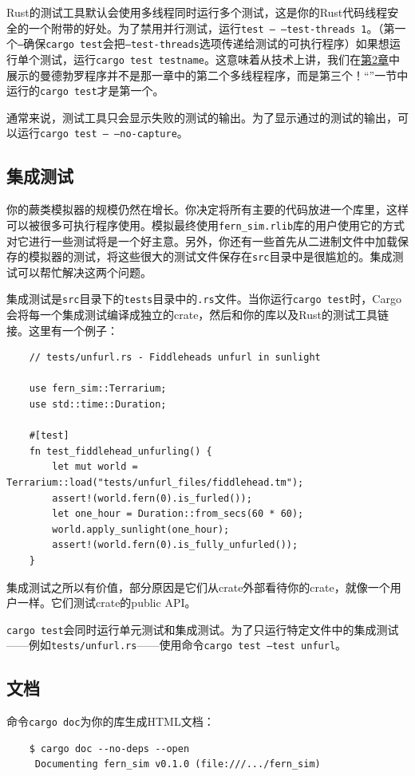 Rust的测试工具默认会使用多线程同时运行多个测试，这是你的Rust代码线程安全的一个附带的好处。为了禁用并行测试，运行\texttt{test -- --test-threads 1}。（第一个\texttt{--}确保\texttt{cargo test}会把\texttt{--test-threads}选项传递给测试的可执行程序）如果想运行单个测试，运行\texttt{cargo test testname}。这意味着从技术上讲，我们在\hyperref[ch02]{第2章}中展示的曼德勃罗程序并不是那一章中的第二个多线程程序，而是第三个！“”一节中运行的\texttt{cargo test}才是第一个。

通常来说，测试工具只会显示失败的测试的输出。为了显示通过的测试的输出，可以运行\texttt{cargo test -- --no-capture}。

\subsection{集成测试}
你的蕨类模拟器的规模仍然在增长。你决定将所有主要的代码放进一个库里，这样可以被很多可执行程序使用。模拟最终使用\texttt{fern\_sim.rlib}库的用户使用它的方式对它进行一些测试将是一个好主意。另外，你还有一些首先从二进制文件中加载保存的模拟器的测试，将这些很大的测试文件保存在\texttt{src}目录中是很尴尬的。集成测试可以帮忙解决这两个问题。

集成测试是\texttt{src}目录下的\texttt{tests}目录中的\texttt{.rs}文件。当你运行\texttt{cargo test}时，Cargo会将每一个集成测试编译成独立的crate，然后和你的库以及Rust的测试工具链接。这里有一个例子：
\begin{verbatim}
    // tests/unfurl.rs - Fiddleheads unfurl in sunlight

    use fern_sim::Terrarium;
    use std::time::Duration;

    #[test]
    fn test_fiddlehead_unfurling() {
        let mut world = Terrarium::load("tests/unfurl_files/fiddlehead.tm");
        assert!(world.fern(0).is_furled());
        let one_hour = Duration::from_secs(60 * 60);
        world.apply_sunlight(one_hour);
        assert!(world.fern(0).is_fully_unfurled());
    }
\end{verbatim}

集成测试之所以有价值，部分原因是它们从crate外部看待你的crate，就像一个用户一样。它们测试crate的public API。

\texttt{cargo test}会同时运行单元测试和集成测试。为了只运行特定文件中的集成测试——例如\texttt{tests/unfurl.rs}——使用命令\texttt{cargo test --test unfurl}。

\subsection{文档}
命令\texttt{cargo doc}为你的库生成HTML文档：
\begin{verbatim}
    $ cargo doc --no-deps --open
     Documenting fern_sim v0.1.0 (file:///.../fern_sim)
\end{verbatim}

